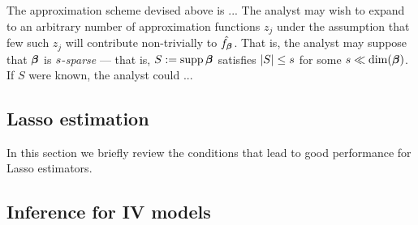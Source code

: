 \documentclass{uwstat572}
\theoremstyle{definition}
\theoremstyle{remark}
\newcommand{\Q}{\mathbb{Q}}
\newcommand{\ga}{\alpha}
\newcommand{\gep}{\epsilon}
\newcommand{\gth}{\theta}
\newcommand{\supp}{\mathrm{supp} \,}
\newcommand{\E}{\mathrm{E}}
\newcommand{\bs}[1]{\boldsymbol{#1}}
\numberwithin{equation}{section}
\begin{document}
The approximation scheme devised above is ... The analyst may wish to expand to an arbitrary number of approximation functions $z_j$ under the assumption that few such $z_j$ will contribute non-trivially to $\fbhat$. That is, the analyst may suppose that $\regb$ is $\sb$-\emph{sparse} --- that is, $\Sb := \supp \regb$ satisfies $|\Sb| \leq \sb$ for some $\sb \ll \dim(\regb)$. If $S$ were known, the analyst could ...   


%
% 
\subsection{Lasso estimation}

In this section we briefly review the conditions that lead to good performance for Lasso estimators. 




%
%
\subsection{Inference for IV models}
\newcommand{\regt}{\gth}
\newcommand{\regg}{\bs{\gamma}}
\newcommand{\rega}{\bs{\ga}}
\newcommand{\regahat}{\hat{\rega}}
\newcommand{\erfi}{v_i}
\newcommand{\erfc}{v}
\newcommand{\ersc}{\gep}
\newcommand{\sds}{\sd_\ersc}
\newcommand{\sdf}{\sd_\erfc}
\renewcommand{\a}{\bs{a}}
\newcommand{\ahat}{\hat{\a}}
\newcommand{\sdfs}{\sd_{\erfc\ersc}}
\newcommand{\xinst}{\x^\dagger}
\newcommand{\xinsti}{x_i^\dagger}
\newcommand{\ainst}{\a^\dagger}
\newcommand{\ainsti}{\a_i^\dagger}
\newcommand{\ainstihat}{\hat{\a}_i^\dagger}
\newcommand{\ainstihatkpt}{\hat{\a}_i^{\dagger\kpt}}
\newcommand{\ainstikpt}{\a_i^{\dagger\kpt}}
\newcommand{\ainstkpt}{\a^{\dagger\kpt}}
\renewcommand{\rm}{\bs{\Delta}}
\newcommand{\g}{\bs{g}}
\renewcommand{\Q}{\bs{Q}}
\newcommand{\Qn}{\Q_n}
\newcommand{\Qnhat}{\hat{\Q}_n}
\newcommand{\Om}{\bs{\Omega}}
\newcommand{\Omn}{\Om_n}
\newcommand{\EEn}{\bar{\E}}
\newcommand{\regaiv}{\regahat^\dagger}
\newcommand{\sdshat}{\hat{\sds}}
\end{document}
